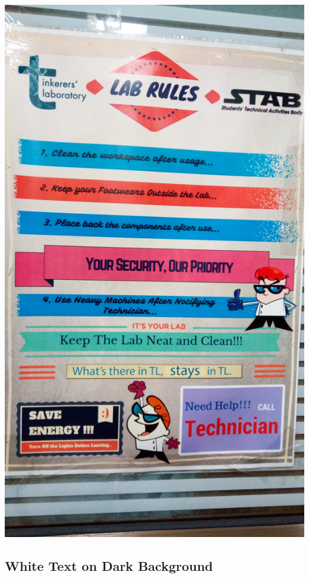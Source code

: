 \documentclass{article}
\begin{document}
\includegraphics[scale=0.05]{lab_rules/original_lab_rules}

\subsection*{White Text on Dark Background}
\end{document}
